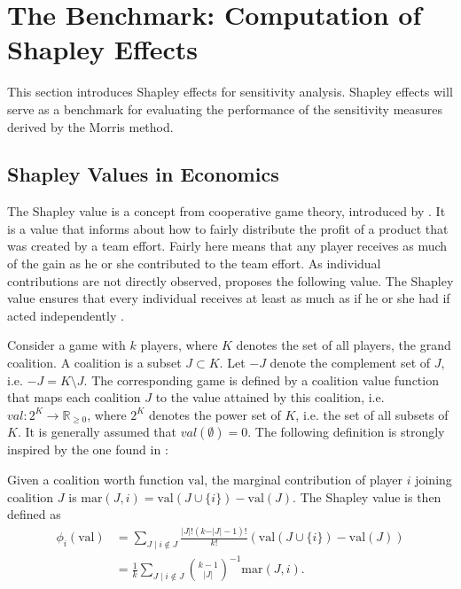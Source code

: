 \section{The Benchmark: Computation of Shapley Effects} \label{comp_shap}

This section introduces Shapley effects for sensitivity analysis. Shapley effects will serve as a benchmark for evaluating the performance of the sensitivity measures derived by the Morris method.

\subsection{Shapley Values in Economics}

The Shapley value is a concept from cooperative game theory, introduced by \citet{S53}. It is a value that informs about how to fairly distribute the profit of a product that was created by a team effort. Fairly here means that any player receives as much of the gain as he or she contributed to the team effort. As individual contributions are not directly observed, \citet{S53} proposes the following value. The Shapley value ensures that every individual receives at least as much as if he or she had if acted independently \citep{IP19}.

Consider a game with $k$ players, where $K$ denotes the set of all players, the grand coalition. A coalition is a subset $J \subset K$. Let $- J$ denote the complement set of $J$, i.e. $- J = K \setminus{J}$. The corresponding game is defined by a coalition value function that maps each coalition $J$ to the value attained by this coalition, i.e. $val: 2^K \to \mathbb{R}_{\geq 0}$, where $2^K$ denotes the power set of $K$, i.e. the set of all subsets of $K$. It is generally assumed that $val(\emptyset) = 0$. The following definition is strongly inspired by the one found in \citet{PRB20}:

\begin{definition}

Given a coalition worth function $\text{val}$, the marginal contribution of player $i$ joining coalition $J$ is $\text{mar}(J, i)=\text{val}(J \cup \{i\}) - \text{val}(J)$. The Shapley value is then defined as
\begin{equation*}
\begin{split}
\phi_{i} (\text{val})& = \sum_{J \mid i \notin J} \frac{\vert J \vert ! (k - \vert J \vert - 1) ! }{ k !} (\text{val}(J \cup \{i\}) - \text{val}(J)) \\
& = \frac{1}{k} \sum_{J \mid i \notin J} \binom{k-1}{\vert J \vert}^{-1} \text{mar}(J, i).
\end{split}
\end{equation*}

\end{definition}

